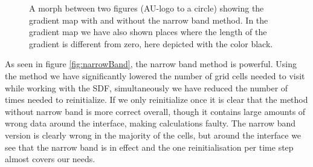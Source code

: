 \begin{figure}[h]
  \centering 

  \caption{A morph between two figures (AU-logo to a circle) showing
  the gradient map with and without the narrow band method. In the
  gradient map we have also shown places where the length of the
  gradient is different from zero, here depicted with the color
  black.}

 \label{fig:narrowBand}
\end{figure}

As seen in figure \vref{fig:narrowBand}, the narrow band method is
powerful. Using the method we have significantly lowered the number of
grid cells needed to visit while working with the SDF, simultaneously we
have reduced the number of times needed to reinitialize. If we only
reinitialize once it is clear that the method without narrow band is
more correct overall, though it contains large amounts of wrong data
around the interface, making calculations faulty. The narrow band
version is clearly wrong in the majority of the cells, but around the
interface we see that the narrow band is in effect and the one
reinitialisation per time step almost covers our needs. 


